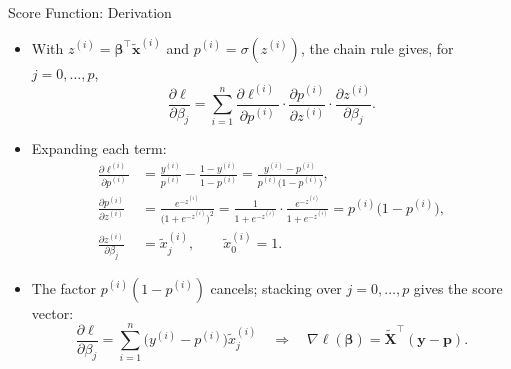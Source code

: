 \begin{frame}{Score Function: Derivation}
    \begin{itemize}
        \item With $z^{(i)} = \symbf{\beta}^\top \tilde{\mathbf{x}}^{(i)}$ and $p^{(i)} = \sigma(z^{(i)})$, the chain rule gives, for $j = 0, \dots, p$,
        \[
            \frac{\partial \ell}{\partial \beta_j} = \sum_{i=1}^{n} \frac{\partial \ell^{(i)}}{\partial p^{(i)}} \cdot \frac{\partial p^{(i)}}{\partial z^{(i)}} \cdot \frac{\partial z^{(i)}}{\partial \beta_j}.
        \]
        \item Expanding each term:
        \[
            \begin{aligned}
                \frac{\partial \ell^{(i)}}{\partial p^{(i)}} &= \frac{y^{(i)}}{p^{(i)}} - \frac{1 - y^{(i)}}{1 - p^{(i)}} = \frac{y^{(i)} - p^{(i)}}{p^{(i)} \big(1 - p^{(i)}\big)}, \\[-2pt]
                \frac{\partial p^{(i)}}{\partial z^{(i)}} &= \frac{e^{-z^{(i)}}}{\big(1 + e^{-z^{(i)}}\big)^2} = \frac{1}{1 + e^{-z^{(i)}}} \cdot \frac{e^{-z^{(i)}}}{1 + e^{-z^{(i)}}} = p^{(i)} \big(1 - p^{(i)}\big), \\[-2pt]
                \frac{\partial z^{(i)}}{\partial \beta_j} &= \tilde{x}_j^{(i)}, \qquad \tilde{x}_0^{(i)} = 1.
            \end{aligned}
        \]
        \item The factor $p^{(i)} (1 - p^{(i)})$ cancels; stacking over $j = 0, \dots, p$ gives the score vector:
        \[
            \frac{\partial \ell}{\partial \beta_j} = \sum_{i=1}^{n} \big(y^{(i)} - p^{(i)}\big) \tilde{x}_j^{(i)}
            \quad \Longrightarrow \quad
            \nabla \ell(\symbf{\beta}) = \tilde{\mathbf{X}}^\top (\mathbf{y} - \mathbf{p}).
        \]
    \end{itemize}
\end{frame}



